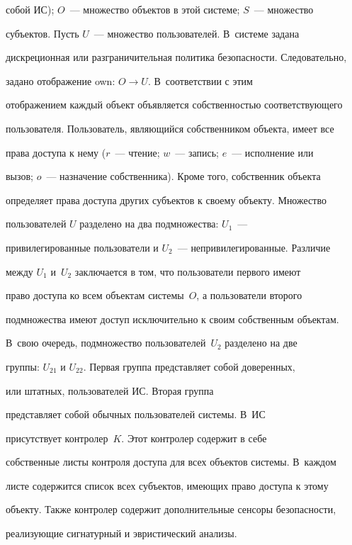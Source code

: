 собой ИС); $O$~--- множество объектов в этой системе; $S$~--- множество 


субъектов. Пусть $U$~--- множество пользователей. В~системе задана 


дискреционная или разграничительная политика безопасности. Следовательно, 


задано отображение own: $O\rightarrow U$. В~соответствии с этим 


отображением каждый объект объявляется собственностью соответствующего 


пользователя. Пользователь, являющийся собственником объекта, имеет все 


права доступа к нему ($r$~--- чтение; $w$~--- запись; $e$~--- исполнение или 


вызов; $o$~--- назначение собственника). Кроме того, собственник объекта 


определяет права доступа других субъектов к своему объекту. Множество 


пользователей $U$ разделено на два подмножества: $U_1$~--- 


привилегированные пользователи и $U_2$~--- непривилегированные. Различие 


между $U_1$ и~$U_2$ заключается в том, что пользователи первого имеют 


право доступа ко всем объектам системы~$O$, а пользователи второго 


подмножества имеют доступ исключительно к своим собственным объектам. 


В~свою очередь, подмножество пользователей~$U_2$ разделено на две 


группы: $U_{21}$ и $U_{22}$. Первая группа представляет собой доверенных, 


или штатных, пользователей ИС. Вторая группа 


представляет собой обычных пользователей системы. В~ИС 


присутствует контролер~$K$. Этот контролер содержит в себе 


собственные листы контроля доступа для всех объектов системы. В~каждом 


листе содержится список всех субъектов, имеющих право доступа к этому 


объекту. Также контролер содержит дополнительные сенсоры безопасности, 


реализующие сигнатурный  и эвристический анализы.


     


